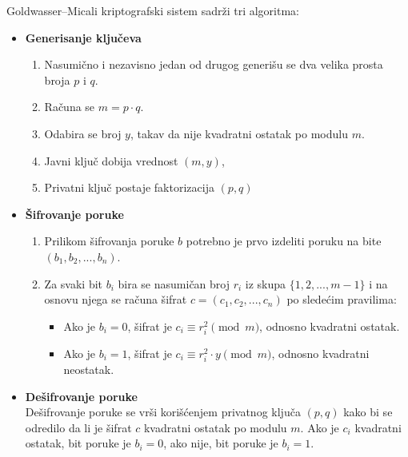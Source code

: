 \textenglish{Goldwasser–Micali} kriptografski sistem sadrži tri algoritma:
\begin{itemize}
	\item {\bf Generisanje ključeva}
	\begin{enumerate}
		\item Nasumično i nezavisno jedan od drugog generišu se dva velika prosta broja $p$ i $q$.
		\item Računa se $m = p \cdot q$.
		\item Odabira se broj $y$, takav da nije kvadratni ostatak po modulu $m$.
		\item Javni ključ dobija vrednost $(m,y)$,
		\item Privatni ključ postaje faktorizacija $(p,q)$
	\end{enumerate}
	\item {\bf Šifrovanje poruke}
	\begin{enumerate}
		\item Prilikom šifrovanja poruke $b$ potrebno je prvo izdeliti poruku na bite $(b_{1},b_{2},...,b_{n})$.
		\item Za svaki bit $b_{i}$ bira se nasumičan broj $r_{i}$ iz skupa $\{1,2,...,m-1\}$ i na osnovu njega se računa  šifrat $c=(c_{1},c_{2},...,c_{n})$ po sledećim pravilima:
		\begin{itemize}
			\item Ako je $b_{i}=0$, šifrat je   $c_{i}\equiv r_{i}^{2} \pmod m$, odnosno kvadratni ostatak.
			\item Ako je $b_{i}=1$, šifrat je   $c_{i}\equiv r_{i}^{2}\cdot y \pmod m$, odnosno kvadratni neostatak.
		\end{itemize}
	\end{enumerate}
	\item {\bf Dešifrovanje poruke}\\
	Dešifrovanje poruke se vrši korišćenjem privatnog ključa $(p,q)$ kako bi se odredilo da li je šifrat $c$ kvadratni ostatak po modulu $m$. Ako je $c_{i}$ kvadratni ostatak, bit poruke je $b_{i} = 0$, ako nije, bit poruke je $b_{i}=1$. 
\end{itemize}


